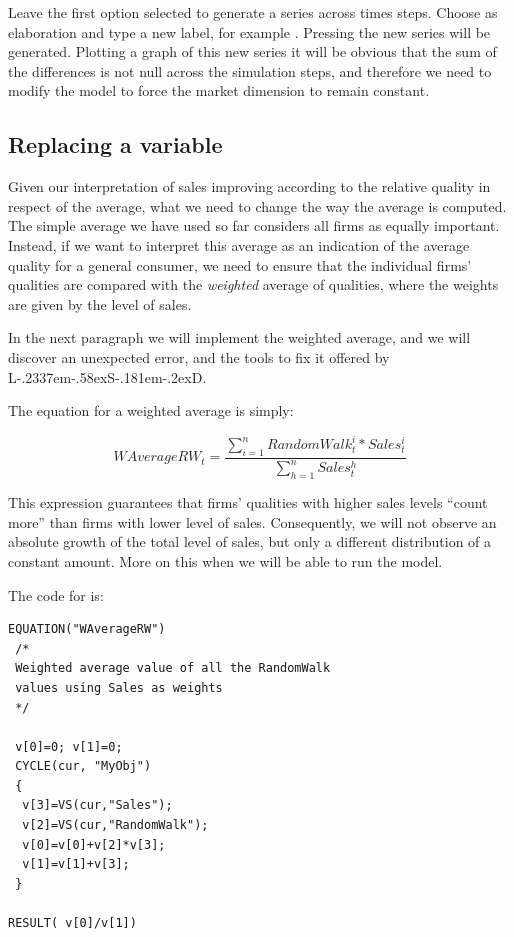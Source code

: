 \documentclass [11pt,a4paper] {book}
\def\LsD{{L\kern-.2337em\lower-.58ex\hbox{S}\kern-.181em\lower-.2ex\hbox{D}}\xspace}
\begin{document}
Leave the first option selected to generate a series across times steps. Choose  as elaboration and type a new label, for example . Pressing  the new series will be generated. Plotting a graph of this new series it will be obvious that the sum of the differences is not null across the simulation steps, and therefore we need to modify the model to force the market dimension to remain constant.





\subsection{Replacing a variable}

Given our interpretation of sales improving according to the relative quality in respect
of the average, what we need to change the way the average is computed. The simple
average we have used so far considers all firms as equally important. Instead, if we want
to interpret this average as an indication of the average quality for a general consumer, we need to ensure that the individual firms' qualities are compared with the \emph{weighted} average of qualities, where the weights are given by the level of sales.

In the next paragraph we will implement the weighted average, and we will discover an
unexpected error, and the tools to fix it offered by \LsD.

The equation for a weighted average is simply:

$$WAverageRW_{t}=\frac{\displaystyle
\sum_{i=1}^nRandomWalk_{t}^i*Sales_{t}^i}{\displaystyle\sum_{h=1}^n Sales_{t}^h}$$

This expression guarantees that firms' qualities with higher sales levels ``count more''
than firms with lower level of sales. Consequently, we will not observe an absolute
growth of the total level of sales, but only a different distribution of a constant
amount. More on this when we will be able to run the model. 

The code for  is:

\begin{minipage}[h]{10cm}
\small
\begin{verbatim}
EQUATION("WAverageRW")
 /*
 Weighted average value of all the RandomWalk
 values using Sales as weights
 */

 v[0]=0; v[1]=0;
 CYCLE(cur, "MyObj")
 {
  v[3]=VS(cur,"Sales");
  v[2]=VS(cur,"RandomWalk");
  v[0]=v[0]+v[2]*v[3];
  v[1]=v[1]+v[3];
 }

RESULT( v[0]/v[1])

\end{verbatim}
\normalsize
\end{minipage}
\end{document}
